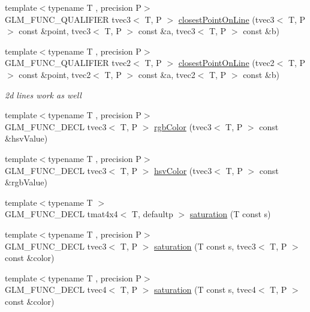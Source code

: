 \begin{DoxyCompactItemize}
{\footnotesize template$<$typename T , precision P$>$ }\\G\+L\+M\+\_\+\+F\+U\+N\+C\+\_\+\+Q\+U\+A\+L\+I\+F\+I\+E\+R tvec3$<$ T, P $>$ \hyperlink{group__gtx__closest__point_gac26353282a8213e469f5e33560c1200f}{closest\+Point\+On\+Line} (tvec3$<$ T, P $>$ const \&point, tvec3$<$ T, P $>$ const \&a, tvec3$<$ T, P $>$ const \&b)
\item 
{\footnotesize template$<$typename T , precision P$>$ }\\G\+L\+M\+\_\+\+F\+U\+N\+C\+\_\+\+Q\+U\+A\+L\+I\+F\+I\+E\+R tvec2$<$ T, P $>$ \hyperlink{group__gtx__closest__point_gadc7010070bb0cacd284f560299b21660}{closest\+Point\+On\+Line} (tvec2$<$ T, P $>$ const \&point, tvec2$<$ T, P $>$ const \&a, tvec2$<$ T, P $>$ const \&b)
\begin{DoxyCompactList}\small\item\em 2d lines work as well \end{DoxyCompactList}\item 
{\footnotesize template$<$typename T , precision P$>$ }\\G\+L\+M\+\_\+\+F\+U\+N\+C\+\_\+\+D\+E\+C\+L tvec3$<$ T, P $>$ \hyperlink{group__gtx__color__space_ga36b0619e31daf57bc4a54dac2dcf34b7}{rgb\+Color} (tvec3$<$ T, P $>$ const \&hsv\+Value)
\item 
{\footnotesize template$<$typename T , precision P$>$ }\\G\+L\+M\+\_\+\+F\+U\+N\+C\+\_\+\+D\+E\+C\+L tvec3$<$ T, P $>$ \hyperlink{group__gtx__color__space_gae72039c00a7be2f03a3b94b37a54349a}{hsv\+Color} (tvec3$<$ T, P $>$ const \&rgb\+Value)
\item 
{\footnotesize template$<$typename T $>$ }\\G\+L\+M\+\_\+\+F\+U\+N\+C\+\_\+\+D\+E\+C\+L tmat4x4$<$ T, defaultp $>$ \hyperlink{group__gtx__color__space_gafecfb15d58da8445103745af3348e516}{saturation} (T const s)
\item 
{\footnotesize template$<$typename T , precision P$>$ }\\G\+L\+M\+\_\+\+F\+U\+N\+C\+\_\+\+D\+E\+C\+L tvec3$<$ T, P $>$ \hyperlink{group__gtx__color__space_ga632ee8dadb44e90a05885f6f8c07d46c}{saturation} (T const s, tvec3$<$ T, P $>$ const \&color)
\item 
{\footnotesize template$<$typename T , precision P$>$ }\\G\+L\+M\+\_\+\+F\+U\+N\+C\+\_\+\+D\+E\+C\+L tvec4$<$ T, P $>$ \hyperlink{group__gtx__color__space_ga2033e0566c595230714af396744e8a61}{saturation} (T const s, tvec4$<$ T, P $>$ const \&color)

\end{DoxyCompactItemize}

